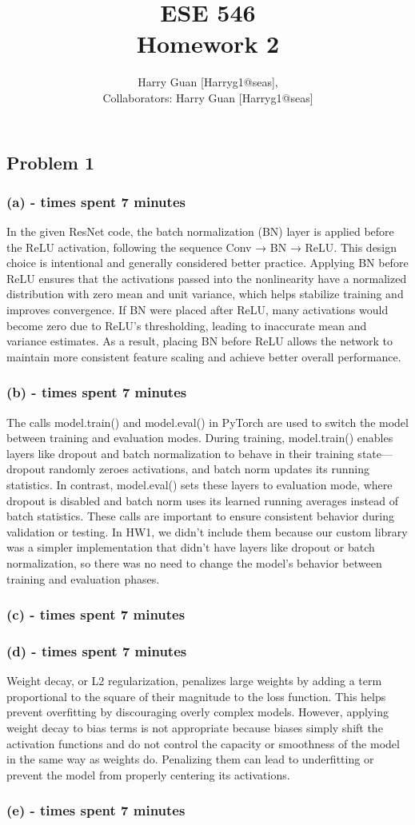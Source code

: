 \documentclass[11pt, reqno, letterpaper, twoside]{amsart}
\title{ESE 546\\[0.1in]
Homework 2}
\author{
Harry Guan [Harryg1@seas],\\
Collaborators: Harry Guan [Harryg1@seas]
}
\theoremstyle{plain}
\theoremstyle{definition}
\begin{document}
\maketitle

\subsection*{Problem 1}

\subsubsection*{(a) - times spent 7 minutes} In the given ResNet code, the batch normalization (BN) layer is applied before the ReLU activation, following the sequence Conv → BN → ReLU. This design choice is intentional and generally considered better practice. Applying BN before ReLU ensures that the activations passed into the nonlinearity have a normalized distribution with zero mean and unit variance, which helps stabilize training and improves convergence. If BN were placed after ReLU, many activations would become zero due to ReLU’s thresholding, leading to inaccurate mean and variance estimates. As a result, placing BN before ReLU allows the network to maintain more consistent feature scaling and achieve better overall performance.
\subsubsection*{(b) - times spent 7 minutes} The calls model.train() and model.eval() in PyTorch are used to switch the model between training and evaluation modes. During training, model.train() enables layers like dropout and batch normalization to behave in their training state—dropout randomly zeroes activations, and batch norm updates its running statistics. In contrast, model.eval() sets these layers to evaluation mode, where dropout is disabled and batch norm uses its learned running averages instead of batch statistics. These calls are important to ensure consistent behavior during validation or testing. In HW1, we didn’t include them because our custom library was a simpler implementation that didn’t have layers like dropout or batch normalization, so there was no need to change the model’s behavior between training and evaluation phases.
\subsubsection*{(c) - times spent 7 minutes}
\subsubsection*{(d) - times spent 7 minutes}
Weight decay, or L2 regularization, penalizes large weights by adding a term proportional to the square of their magnitude to the loss function. This helps prevent overfitting by discouraging overly complex models. However, applying weight decay to bias terms is not appropriate because biases simply shift the activation functions and do not control the capacity or smoothness of the model in the same way as weights do. Penalizing them can lead to underfitting or prevent the model from properly centering its activations.
\subsubsection*{(e) - times spent 7 minutes}
\end{document}
